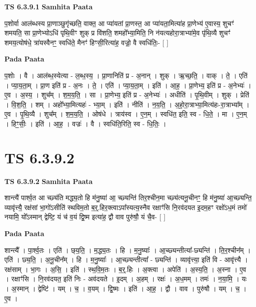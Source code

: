 \documentclass[17pt]{extarticle}
\begin{document}
\textbf{TS 6.3.9.1 } \newline
\textbf{Samhita Paata} \newline

प॒शोर्वा आल॑ब्धस्य प्रा॒णाञ्छुगृ॑च्छति॒ वाक्त॒ आ प्या॑यतां प्रा॒णस्त॒ आ प्या॑यता॒मित्या॑ह प्रा॒णेभ्य॑ ए॒वास्य॒ शुचꣳ॑ शमयति॒ सा प्रा॒णेभ्योऽधि॑ पृथि॒वीꣳ शुक् प्र वि॑शति॒ शमहो᳚भ्या॒मिति॒ नि न॑यत्यहोरा॒त्राभ्या॑मे॒व पृ॑थि॒व्यै शुचꣳ॑ शमय॒त्योष॑धे॒ त्रा॑यस्वैनꣳ॒॒ स्वधि॑ते॒ मैनꣳ॑ हिꣳसी॒रित्या॑ह॒ वज्रो॒॒ वै स्वधि॑तिः॒- [  ] \newline

\textbf{Pada Paata} \newline

प॒शोः । वै । आल॑ब्ध॒स्येत्या - ल॒ब्ध॒स्य॒ । प्रा॒णानिति॑ प्र - अ॒नान् । शुक् । ऋ॒च्छ॒ति॒ । वाक् । ते॒ । एति॑ । प्या॒य॒ता॒म् । प्रा॒ण इति॑ प्र - अ॒नः । ते॒ । एति॑ । प्या॒य॒ता॒म् । इति॑ । आ॒ह॒ । प्रा॒णेभ्य॒ इति॑ प्र - अ॒नेभ्यः॑ । ए॒व । अ॒स्य॒ । शुच᳚म् । श॒म॒य॒ति॒ । सा । प्रा॒णेभ्य॒ इति॑ प्र - अ॒नेभ्यः॑ । अधीति॑ । पृ॒थि॒वीम् । शुक् । प्रेति॑ । वि॒श॒ति॒ । शम् । अहो᳚भ्या॒मित्यहः॑ - भ्या॒म् । इति॑ । नीति॑ । न॒य॒ति॒ । अ॒हो॒रा॒त्राभ्या॒मित्य॑हः-रा॒त्राभ्या᳚म् । ए॒व । पृ॒थि॒व्यै । शुच᳚म् । श॒म॒य॒ति॒ । ओष॑धे । त्राय॑स्व । ए॒न॒म् । स्वधि॑त॒ इति॒ स्व - धि॒ते॒ । मा । ए॒न॒म् । हिꣳ॒॒सीः॒ । इति॑ । आ॒ह॒ । वज्रः॑ । वै । स्वधि॑ति॒रिति॒ स्व - धि॒तिः॒ ।  \newline





\section{ TS 6.3.9.2 }

\textbf{TS 6.3.9.2 } \newline
\textbf{Samhita Paata} \newline

शान्त्यै॑ पार्श्व॒त आ च्छ्य॑ति मद्ध्य॒तो हि म॑नु॒ष्या॑ आ॒ च्छ्यन्ति॑ तिर॒श्चीन॒मा च्छ्य॑त्यनू॒चीनꣳ॒॒ हि म॑नु॒ष्या॑ आ॒च्छ्यन्ति॒ व्यावृ॑त्त्यै॒ रक्ष॑सां भा॒गो॑ऽसीति॑ स्थविम॒तो ब॒र्॒.हिर॒क्त्वाऽपा᳚स्यत्य॒स्नैव रक्षाꣳ॑सि नि॒रव॑दयत इ॒दम॒हꣳ रक्षो॑ऽध॒मं तमो॑ नयामि॒ यो᳚ऽस्मान् द्वेष्टि॒ यं च॑ व॒यं द्वि॒ष्म इत्या॑ह॒ द्वौ वाव पुरु॑षौ॒ यं चै॒व- [  ] \newline

\textbf{Pada Paata} \newline

शान्त्यै᳚ । पा॒र्श्व॒तः । एति॑ । छ्‌य॒ति॒ । म॒द्ध्य॒तः । हि । म॒नु॒ष्याः᳚ । आ॒च्छ्यन्तीत्या᳚-छ्यन्ति॑ । ति॒र॒श्चीन᳚म् । एति॑ । छ्य॒ति॒ । अ॒नू॒चीन᳚म् । हि । म॒नु॒ष्याः᳚ । आ॒च्छ्यन्तीत्या᳚ - छ्यन्ति॑ । व्यावृ॑त्त्या॒ इति॑ वि - आवृ॑त्त्यै । रक्ष॑साम् । भा॒गः । अ॒सि॒ । इति॑ । स्थ॒वि॒म॒तः । ब॒र्॒.हिः । अ॒क्त्वा । अपेति॑ । अ॒स्य॒ति॒ । अ॒स्ना । ए॒व । रक्षाꣳ॑सि । नि॒रव॑दयत॒ इति॑ निः - अव॑दयते । इ॒दम् । अ॒हम् । रक्षः॑ । अ॒ध॒मम् । तमः॑ । न॒या॒मि॒ । यः । अ॒स्मान् । द्वेष्टि॑ । यम् । च॒ । व॒यम् । द्वि॒ष्मः । इति॑ । आ॒ह॒ । द्वौ । वाव । पुरु॑षौ । यम् । च॒ । ए॒व ।  \newline
\end{document}
